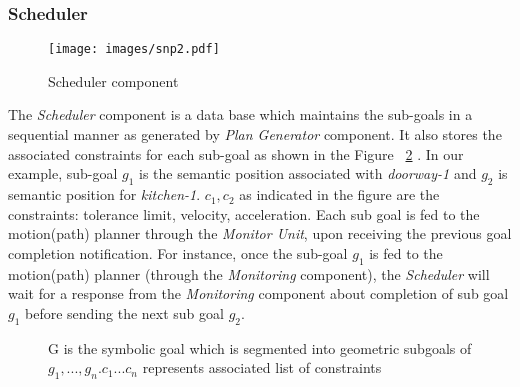 \subsubsection{Scheduler}
\begin{figure}[htbp] %
   \centering
   \texttt{[image: images/snp2.pdf]}
   \caption{Scheduler component}
   \label{Fig:Data flow summery}
\end{figure}
The \textit{Scheduler} component is a data base which maintains the sub-goals in a sequential manner as generated by \textit{Plan Generator} component.
It also stores the associated constraints for each sub-goal as shown in the Figure ~\ref{fig:s} .
In our example, sub-goal $g_{1}$ is the semantic position associated with \textit{doorway-1} and $g_{2}$ is semantic position for \textit{kitchen-1}.
$c_{1}, c_{2}$ as indicated in the figure are the constraints: {tolerance limit, velocity, acceleration}. 
Each sub goal is fed to the motion(path) planner through the \textit{Monitor Unit}, upon receiving the previous goal completion notification. 
For instance, once the sub-goal $g_{1}$ is fed to the motion(path) planner (through the \textit{Monitoring} component), the \textit{Scheduler} will wait for a response from 
the \textit{Monitoring} component about completion of sub goal $g_{1}$ before sending the next sub goal $g_{2}$.

 \begin{figure}[htbp]
 \centering
 \caption[Symbolic goal, geometric subgoals and constraint lists]
 {G is the symbolic goal which is segmented into geometric subgoals of $g_{1},...,g_{n}. c_{1}...c_{n}$ represents associated list of constraints}
 \label{fig:s}
\end{figure}

